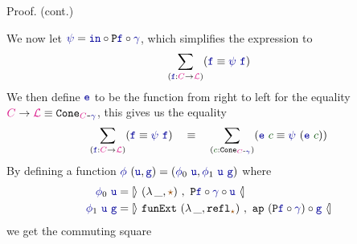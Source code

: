 \documentclass[xelatex,mathserif,serif,notheorems]{beamer} %
\theoremstyle{plain} %
\theoremstyle{definition}
\theoremstyle{remark}
\newcommand*{\term}[1]{\textcolor{green!30!black}{#1}} %
\newcommand*{\type}[1]{\textcolor{magenta!90!black}{#1}}
\newcommand*{\coalg}[2]{#1\texttt{-}#2}
\newcommand*{\constant}[1]{\textcolor{orange!60!black}{\ensuremath{\mathtt{#1}}}}
\newcommand*{\function}[1]{\textcolor{blue!60!black}{\ensuremath{\mathtt{#1}}}}
\newcommand*{\typeformer}[1]{\ensuremath{\mathtt{#1}}}
\newcommand*{\functor}[1]{\ensuremath{\mathbf{\mathtt{#1}}}}
\newcommand*{\unitelem}{\constant{\star}} %
\newcommand*{\natcases}[2]{\ensuremath{\mathbb{[\hspace{-.5mm}\rangle}~\ensuremath{#1}~,~\ensuremath{#2}~\mathbb{\langle\hspace{-.5mm}]}}}
\newcommand{\setlengths}{
  \setlength{\abovedisplayskip}{4pt}
  \setlength{\belowdisplayskip}{4pt}
  \setlength{\abovedisplayshortskip}{2pt}
  \setlength{\belowdisplayshortskip}{2pt}
}
\begin{document}
\begin{frame}[fragile]
  \begin{block}{Proof. (cont.)}\setlengths
    We now let \(\function{\psi} = \function{in} \circ \functor{P}\function{f} \circ \function{\gamma}\), which simplifies the expression to
    \begin{equation}
      \sum_{(\function{f} : \type{C} \rightarrow \type{\mathcal{L}})} (\function{f} \equiv \function{\psi}~\function{f})
    \end{equation}
    We then define \(\function{e}\) to be the function from right to left for the equality \(\type{C} \rightarrow \type{\mathcal{L}} \equiv \typeformer{Cone}_{\coalg{\type{C}}{\function{\gamma}}}\), this gives us the equality
    \begin{equation}
      \sum_{(\function{f} : \type{C} \rightarrow \type{\mathcal{L}})} (\function{f} \equiv \function{\psi}~\function{f}) \quad \equiv \quad \sum_{(\term{c} : \typeformer{Cone}_{\coalg{\type{C}}{\function{\gamma}}})} (\function{e}~\term{c} \equiv \function{\psi}~(\function{e}~\term{c}))
    \end{equation}
    By defining a function \(\function{\phi}~(\function{u},\function{g}) = (\function{\phi}_0~\function{u},\function{\phi}_1~\function{u}~\function{g})\) where
    \begin{align}
      \function{\phi}_0~\function{u} &= \natcases{(\lambda\,\_, \unitelem)}{\functor{P}\function{f} \circ \function{\gamma} \circ \function{u}} \\
      \function{\phi}_1~\function{u}~\function{g} &= \natcases{\mathtt{funExt}~(\lambda\,\_, \mathtt{refl}_{\unitelem})}{\mathtt{ap}~(\functor{P}\function{f} \circ \function{\gamma}) \circ \function{g}}
    \end{align}
    we get the commuting square\vspace{-4.5mm}
    \begin{figure}
      \centering
    \end{figure}
  \end{block}
\end{frame}
\end{document}

